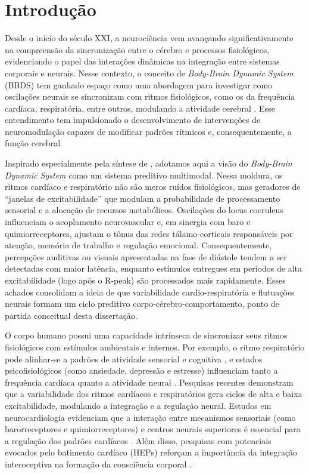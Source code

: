\chapter{Introdução}
\label{chap:introducao}
Desde o início do século XXI, a neurociência vem avançando significativamente na compreensão da sincronização entre o cérebro e processos fisiológicos, evidenciando o papel das interações dinâmicas na integração entre sistemas corporais e neurais. Nesse contexto, o conceito de \textit{Body-Brain Dynamic System} (BBDS) tem ganhado espaço como uma abordagem para investigar como oscilações neurais se sincronizam com ritmos fisiológicos, como os da frequência cardíaca, respiratória, entre outros, modulando a atividade cerebral \cite{cohen2017where,criscuolo2022cognition}. Esse entendimento tem impulsionado o desenvolvimento de intervenções de neuromodulação capazes de modificar padrões rítmicos e, consequentemente, a função cerebral.

Inspirado especialmente pela síntese de , adotamos aqui a visão do \textit{Body-Brain Dynamic System} como um sistema preditivo multimodal. Nessa moldura, os ritmos cardíaco e respiratório não são meros ruídos fisiológicos, mas geradores de ``janelas de excitabilidade'' que modulam a probabilidade de processamento sensorial e a alocação de recursos metabólicos.  Oscilações do locus coeruleus influenciam o acoplamento neurovascular e, em sinergia com baro e quimiorreceptores, ajustam o tônus das redes tálamo-corticais responsáveis por atenção, memória de trabalho e regulação emocional. Consequentemente, percepções auditivas ou visuais apresentadas na fase de diástole tendem a ser detectadas com maior latência, enquanto estímulos entregues em períodos de alta excitabilidade (logo após o R-peak) são processados mais rapidamente. Esses achados consolidam a ideia de que variabilidade cardio-respiratória e flutuações neurais formam um ciclo preditivo corpo-cérebro-comportamento, ponto de partida conceitual desta dissertação.

O corpo humano possui uma capacidade intrínseca de sincronizar seus ritmos fisiológicos com estímulos ambientais e internos. Por exemplo, o ritmo respiratório pode alinhar-se a padrões de atividade sensorial e cognitiva \cite{haas1985effects}, e estados psicofisiológicos (como ansiedade, depressão e estresse) influenciam tanto a frequência cardíaca quanto a atividade neural \cite{criscuolo2022cognition}. Pesquisas recentes demonstram que a variabilidade dos ritmos cardíacos e respiratórios gera ciclos de alta e baixa excitabilidade, modulando a integração e a regulação neural. Estudos em neurocardiologia evidenciam que a interação entre mecanismos sensoriais (como barorreceptores e quimiorreceptores) e centros neurais superiores é essencial para a regulação dos padrões cardíacos \cite{marcondes2024linguagem}. Além disso, pesquisas com potenciais evocados pelo batimento cardíaco (HEPs) reforçam a importância da integração interoceptiva na formação da consciência corporal \cite{banelli2020skipping, mackinnon2013utilizing, park2018neural}.

